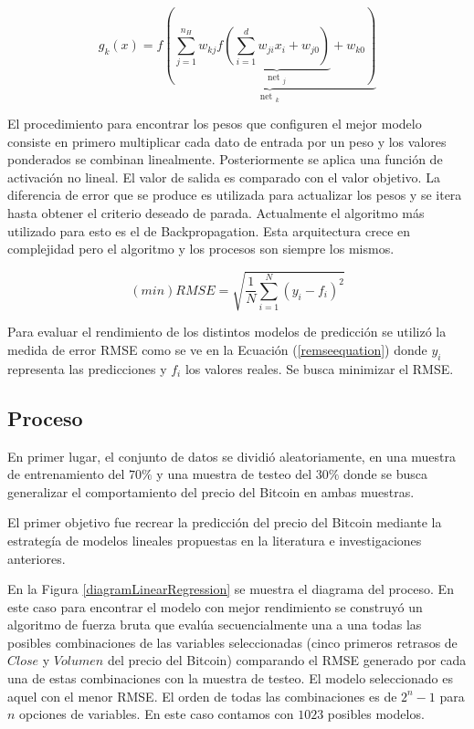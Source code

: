 \documentclass[a4paper,12pt,twocolumn]{article}
\begin{document}
\begin{equation}
g_{k}(x)=f \underbrace{(\sum_{j=1}^{n_{H}} w_{k j} f \underbrace{\left(\sum_{i=1}^{d} w_{j i} x_{i}+w_{j 0}\right)}_{\text {net }_{j}}+w_{k 0})}_{\text {net }_{k}}
\label{ecuacionRedes}
\end{equation}

El procedimiento para encontrar los pesos que configuren el mejor modelo consiste en primero multiplicar cada dato de entrada por un peso y los valores ponderados se combinan linealmente. Posteriormente se aplica una función de activación no lineal. El valor de salida es comparado con el valor objetivo. La diferencia de error que se produce es utilizada para actualizar los pesos y se itera hasta obtener el criterio deseado de parada. Actualmente el algoritmo más utilizado para esto es el de Backpropagation. Esta arquitectura crece en complejidad pero el algoritmo y los procesos son siempre los mismos. 

\begin{equation}
(min)RMSE=\sqrt{\frac{1}{N} \sum_{i=1}^{N}\left(y_{i}-f_{i}\right)^{2}}
\label{remseequation}
\end{equation}

Para evaluar el rendimiento de los distintos modelos de predicción se utilizó la medida de error RMSE como se ve en la Ecuación (\ref{remseequation}) donde $y_i$ representa las predicciones y $f_i$ los valores reales. Se busca minimizar el RMSE.

\subsection{Proceso}

En primer lugar, el conjunto de datos se dividió aleatoriamente, en una muestra de entrenamiento del $70\%$ y una muestra de testeo del $30\%$ donde se busca generalizar el comportamiento del precio del Bitcoin en ambas muestras.

El primer objetivo fue recrear la predicción del precio del Bitcoin mediante la estrategía de modelos lineales propuestas en la literatura e investigaciones anteriores. 

En la Figura \ref{diagramLinearRegression} se muestra el diagrama del proceso. En este caso para encontrar el modelo con mejor rendimiento se construyó un algoritmo de fuerza bruta que evalúa secuencialmente una a una todas las posibles combinaciones de las variables seleccionadas (cinco primeros retrasos de $Close$ y $Volumen$ del precio del Bitcoin) comparando el RMSE generado por cada una de estas combinaciones con la muestra de testeo. El modelo seleccionado es aquel con el menor RMSE. El orden de todas las combinaciones es de $2^n - 1$ para $n$ opciones de variables. En este caso contamos con $1023$ posibles modelos.
\end{document}
